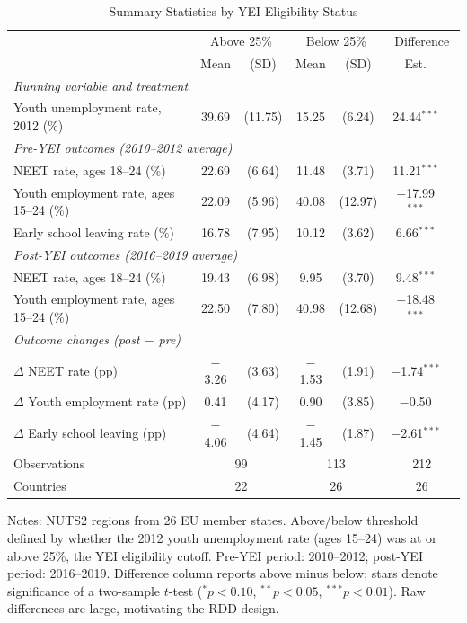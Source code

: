 \begin{table}[h!]
\centering
\caption{Summary Statistics by YEI Eligibility Status}
\label{tab:summary}
\small
\begin{tabular}{lcccccc}
\toprule
 & \multicolumn{2}{c}{Above 25\%} & \multicolumn{2}{c}{Below 25\%} & \multicolumn{2}{c}{Difference} \\
 & Mean & (SD) & Mean & (SD) & Est. & \\
\midrule
\multicolumn{7}{l}{\textit{Running variable and treatment}} \\
Youth unemployment rate, 2012 (\%)         & 39.69 & (11.75) & 15.25 & (6.24) & 24.44$^{***}$ \\
\midrule
\multicolumn{7}{l}{\textit{Pre-YEI outcomes (2010--2012 average)}} \\
NEET rate, ages 18--24 (\%)                & 22.69 & (6.64) & 11.48 & (3.71) & 11.21$^{***}$ \\
Youth employment rate, ages 15--24 (\%)    & 22.09 & (5.96) & 40.08 & (12.97) & $-$17.99$^{***}$ \\
Early school leaving rate (\%)             & 16.78 & (7.95) & 10.12 & (3.62) & 6.66$^{***}$ \\
\midrule
\multicolumn{7}{l}{\textit{Post-YEI outcomes (2016--2019 average)}} \\
NEET rate, ages 18--24 (\%)                & 19.43 & (6.98) & 9.95 & (3.70) & 9.48$^{***}$ \\
Youth employment rate, ages 15--24 (\%)    & 22.50 & (7.80) & 40.98 & (12.68) & $-$18.48$^{***}$ \\
\midrule
\multicolumn{7}{l}{\textit{Outcome changes (post $-$ pre)}} \\
$\Delta$ NEET rate (pp)                    & $-$3.26 & (3.63) & $-$1.53 & (1.91) & $-$1.74$^{***}$ \\
$\Delta$ Youth employment rate (pp)        & 0.41 & (4.17) & 0.90 & (3.85) & $-$0.50 \\
$\Delta$ Early school leaving (pp)         & $-$4.06 & (4.64) & $-$1.45 & (1.87) & $-$2.61$^{***}$ \\
\midrule
Observations & \multicolumn{2}{c}{99} & \multicolumn{2}{c}{113} & \multicolumn{2}{c}{212} \\
Countries & \multicolumn{2}{c}{22} & \multicolumn{2}{c}{26} & \multicolumn{2}{c}{26} \\
\bottomrule
\end{tabular}

\raggedright\footnotesize
Notes: NUTS2 regions from 26 EU member states. Above/below threshold defined by whether the 2012 youth unemployment rate (ages 15--24) was at or above 25\%, the YEI eligibility cutoff. Pre-YEI period: 2010--2012; post-YEI period: 2016--2019. Difference column reports above minus below; stars denote significance of a two-sample $t$-test ($^{*}p<0.10$, $^{**}p<0.05$, $^{***}p<0.01$). Raw differences are large, motivating the RDD design.
\end{table}
